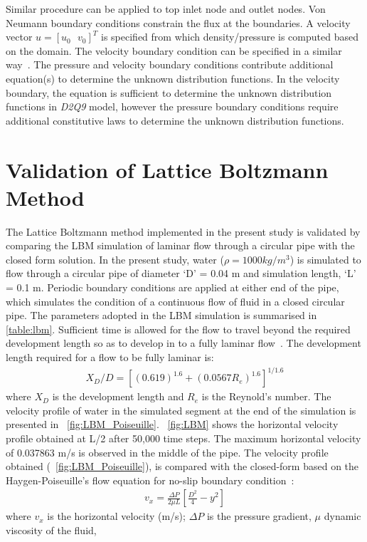 Similar procedure can be applied to top inlet node and outlet nodes. Von Neumann boundary conditions constrain the flux at the boundaries. A velocity vector $u=\left[ u_0\mbox{ }v_0 \right]^T$ is specified from which density/pressure is computed based on the domain. The velocity boundary condition can be specified in a similar way~\citep{Zou1997}. The pressure and velocity boundary conditions contribute additional equation(s) to determine the unknown distribution functions. In the velocity boundary, the equation is sufficient to determine the unknown distribution functions in \textit{D2Q9} model, however the pressure boundary conditions require additional constitutive laws to determine the unknown distribution functions. 

\section{Validation of Lattice Boltzmann Method}
The Lattice Boltzmann method implemented in the present study is validated by comparing the LBM simulation of laminar flow  through a circular pipe with the closed form solution. In the present study, water ($\rho=1000 kg/m^{3}$) is simulated to flow through a circular pipe of diameter `D' = 0.04 m and simulation length, `L' = 0.1 m. Periodic boundary conditions are applied at either end of the pipe, which simulates the condition of a continuous flow of fluid in a closed circular pipe. The parameters adopted in the LBM simulation is summarised in \cref{table:lbm}. Sufficient time is allowed for the flow to travel beyond the required development length so as to develop in to a fully laminar flow~\citet{Durst2005}. The development length required for a flow to be fully laminar is:
\begin{align}
X_{D}/D=[(0.619)^{1.6}+(0.0567 R_{e})^{1.6}]^{1/1.6}
\end{align}
where $X_{D}$ is the development length and $R_{e}$ is the Reynold's number. The velocity profile of water in the simulated segment at the end of the simulation is presented in ~\cref{fig:LBM_Poiseuille}. ~\cref{fig:LBM} shows the horizontal velocity profile obtained at L/2 after 50,000 time steps. The maximum horizontal velocity of 0.037863 m/s is observed in the middle of the pipe. The velocity profile obtained (~\cref{fig:LBM_Poiseuille}), is compared with the closed-form based on the Haygen-Poiseuille's flow equation for no-slip boundary condition~\citep{Willis2008}:
\begin{align}
\mathit{v}_{\mathit{x}}=\frac{\Delta P}{2 \mu L} [\frac{D^{2}}{4}-y^{2}]
\end{align}
where $v_{x}$ is the horizontal velocity (m/s); $\Delta P$ is the pressure gradient, $\mu$ dynamic viscosity of the fluid, 

